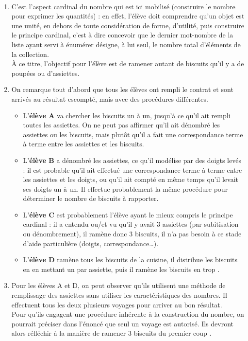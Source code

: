 \ \\ [-5mm]
\begin{enumerate}
   \item C'est l'aspect cardinal du nombre qui est ici mobilisé (construire le nombre pour exprimer les quantités) : en effet, l'élève doit comprendre qu'un objet est une unité, en dehors de toute considération de forme, d'utilité, puis construire le principe cardinal, c'est à dire concevoir que le dernier mot-nombre de la liste ayant servi à énumérer désigne, à lui seul, le nombre total d'éléments de la collection. \\
   À ce titre, l'objectif pour l'élève est de ramener autant de biscuits qu'il y a de poupées ou d'assiettes.
   \bigskip
   \item On remarque tout d'abord que tous les élèves ont rempli le contrat et sont arrivés au résultat escompté, mais avec des procédures différentes.
   \begin{itemize}
      \item L'\textbf{élève A} va chercher les biscuits un à un, jusqu'à ce qu'il ait rempli toutes les assiettes. On ne peut pas affirmer qu'il ait dénombré les assiettes ou les biscuits, mais plutôt qu'il a fait une \og correspondance terme à terme \fg{} entre les assiettes et les biscuits.
      \item L'\textbf{élève B} a dénombré les assiettes, ce qu'il modélise par des doigts levés : il est probable qu'il ait effectué une correspondance terme à terme entre les assiettes et les doigts, ou qu'il ait compté en même temps qu'il levait ses doigts un à un. Il effectue probablement la même procédure pour déterminer le nombre de biscuits à rapporter.
      \item L'\textbf{élève C} est probablement l'élève ayant le mieux compris le principe cardinal : il a entendu ou/et vu qu'il y avait 3 assiettes (par subitisation ou dénombrement), il ramène donc 3 biscuits, il n'a pas besoin à ce stade d'aide particulière (doigts, correspondance\dots{}).
      \item L'\textbf{élève D} ramène tous les biscuits de la cuisine, il distribue les biscuits en en mettant un par assiette, puis il ramène les biscuits \og en trop \fg{}. \\
   \end{itemize}
   \bigskip
   \item Pour les élèves A et D, on peut observer qu'ils utilisent une méthode de \og remplissage \fg{} des assiettes sans utiliser les caractéristiques des nombres. Il effectuent tous les deux plusieurs voyages pour arriver au bon résultat. \\
   Pour qu'ils engagent une procédure inhérente à la construction du nombre, on pourrait préciser dans l'énoncé que seul un voyage est autorisé. Ils devront alors réfléchir à la manière de ramener 3 biscuits \og du premier coup \fg.
\end{enumerate}
